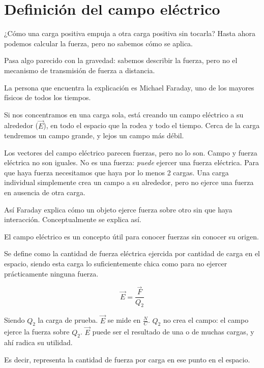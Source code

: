 \section{Definición del campo eléctrico}

¿Cómo una carga positiva empuja a otra carga positiva sin tocarla?
Hasta ahora podemos calcular la fuerza,
pero no sabemos cómo se aplica.

Pasa algo parecido con la gravedad:
sabemos describir la fuerza,
pero no el mecanismo de transmisión de fuerza a distancia.

La persona que encuentra la explicación es 
Michael Faraday, uno de los mayores físicos de todos los tiempos.

Si nos concentramos en una carga sola,
está creando un campo eléctrico a su alrededor (\(\vec{E}\)),
en todo el espacio que la rodea y todo el tiempo.
Cerca de la carga tendremos un campo grande,
y lejos un campo más débil.

Los vectores del campo eléctrico parecen fuerzas,
pero no lo son.
Campo y fuerza eléctrica no son iguales.
No es una fuerza: \textit{puede} ejercer una fuerza eléctrica.
Para que haya fuerza necesitamos que haya por lo menos 2 cargas.
Una carga individual simplemente crea un campo a su alrededor,
pero no ejerce una fuerza en ausencia de otra carga.

Así Faraday explica cómo un objeto ejerce fuerza sobre otro sin que haya interacción.
Conceptualmente se explica así.

El campo eléctrico es un concepto útil para conocer fuerzas sin conocer su origen.

Se define como la cantidad de fuerza eléctrica ejercida por cantidad de carga en el espacio,
siendo esta carga lo suficientemente chica como para no ejercer prácticamente ninguna fuerza.

\vspace{.3cm}
\begin{equation}
    \vec{E} = \frac{\vec{F}}{Q_2}
\end{equation}

Siendo \(Q_2\) la carga de prueba. \(\vec{E}\) se mide en \(\frac{N}{C}\).
\(Q_2\) no crea el campo: el campo ejerce la fuerza sobre \(Q_2\).
\(\vec{E}\) puede ser el resultado de una o de muchas cargas,
y ahí radica su utilidad.

Es decir, representa la cantidad de fuerza por carga en ese punto en el espacio.
